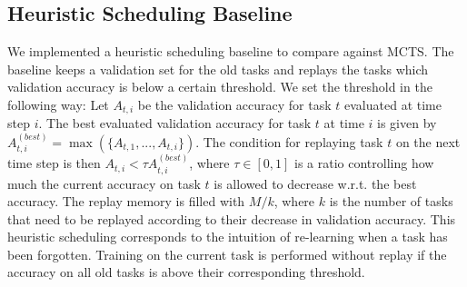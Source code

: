 \subsection{Heuristic Scheduling Baseline}\label{paperC:app:heuristic_scheduling_baseline}

We implemented a heuristic scheduling baseline to compare against MCTS. The baseline keeps a validation set for the old tasks and replays the tasks which validation accuracy is below a certain threshold. We set the threshold in the following way: Let $A_{t, i}$ be the validation accuracy for task $t$ evaluated at time step $i$. The best evaluated validation accuracy for task $t$ at time $i$ is given by $A_{t, i}^{(best)} = \max(\{A_{t, 1}, ..., A_{t, i} \})$. The condition for replaying task $t$ on the next time step is then $A_{t, i} < \tau A_{t, i}^{(best)}$, where $\tau \in [0, 1]$ is a ratio controlling how much the current accuracy on task $t$ is allowed to decrease w.r.t. the best accuracy. The replay memory is filled with $M/k$, where $k$ is the number of tasks that need to be replayed according to their decrease in validation accuracy. This heuristic scheduling corresponds to the intuition of re-learning when a task has been forgotten. Training on the current task is performed without replay if the accuracy on all old tasks is above their corresponding threshold.       

\vspace{-3mm}
